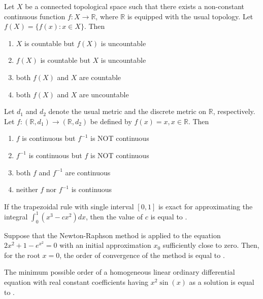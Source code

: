 \item Let $X$ be a connected topological space such that there exists a non-constant continuous function $f : X \to \mathbb{R}$, where $\mathbb{R}$ is equipped with the usual topology. Let $f(X) = \{f(x) : x \in X\}$. Then
    \begin{enumerate}
        \item $X$ is countable but $f(X)$ is uncountable
        \item $f(X)$ is countable but $X$ is uncountable
        \item both $f(X)$ and $X$ are countable
        \item both $f(X)$ and $X$ are uncountable
    \end{enumerate}
\bigskip

\item Let $d_1$ and $d_2$ denote the usual metric and the discrete metric on $\mathbb{R}$, respectively. Let $f : (\mathbb{R}, d_1) \to (\mathbb{R}, d_2)$ be defined by $f(x) = x, x \in \mathbb{R}$. Then

    \begin{enumerate}
        \item $f$ is continuous but $f^{-1}$ is NOT continuous
        \item $f^{-1}$ is continuous but $f$ is NOT continuous
        \item both $f$ and $f^{-1}$ are continuous
        \item neither $f$ nor $f^{-1}$ is continuous
    \end{enumerate}
\bigskip

\item If the trapezoidal rule with single interval $[0,1]$ is exact for approximating the integral $\int_0^1 (x^3 - c x^2) dx$, then the value of $c$ is equal to \underline{\hspace{1cm}}.
\bigskip

\item Suppose that the Newton-Raphson method is applied to the equation $2x^2 + 1 - e^{x^2} = 0$ with an initial approximation $x_0$ sufficiently close to zero. Then, for the root $x = 0$, the order of convergence of the method is equal to \underline{\hspace{1cm}}.
\bigskip
    \item The minimum possible order of a homogeneous linear ordinary differential equation with real constant coefficients having $x^2 \sin(x)$ as a solution is equal to \underline{\hspace{1cm}}.
    
